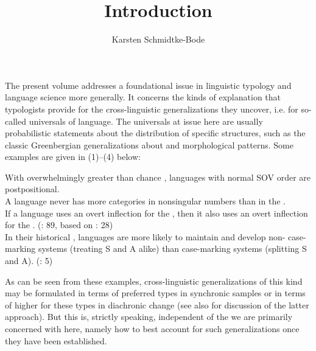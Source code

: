 \documentclass[output=paper]{langsci/langscibook}
\author{Karsten Schmidtke-Bode\affiliation{Leipzig University and Friedrich Schiller University Jena}}
\title{Introduction}
\begin{document}
\maketitle 
 




The present volume addresses a foundational issue in linguistic typology and language science more generally. It concerns the kinds of explanation that typologists provide for the cross-linguistic generalizations they uncover, i.e. for so-called universals of language. The universals at issue here are usually probabilistic statements about the distribution of specific structures, such as the classic Greenbergian generalizations about  and morphological  patterns. Some examples are given in (1)–(4) below:

\ea 
{With overwhelmingly greater than chance , languages with normal SOV order are postpositional. \citep[79]{Greenberg1963}}\\
\z
\ea
{A language never has more  categories in nonsingular numbers than in the . \citep[95]{Greenberg1963}}\\
\z
\ea
{If a language uses an overt inflection for the , then it also uses an overt inflection for the . (\citealt{Croft2003}: 89, based on \citealt{Greenberg1966}: 28)}\\
\z 
\ea
{In their historical , languages are more likely to maintain and develop non- case-marking systems (treating S and A alike) than  case-marking systems (splitting S and A). (\citealt{BickelEtAl2015}: 5)}\\
\z

As can be seen from these examples, cross-linguistic generalizations of this kind may be formulated in terms of preferred types in synchronic samples or in terms of higher  for these types in diachronic change (see also \citealt{Greenberg1978_Diachr,Maslova2000,Cysouw2011,Bickel2013} for discussion of the latter approach). But this is, strictly speaking, independent of the  we are primarily concerned with here, namely how to best account for such generalizations once they have been established.
\end{document}
